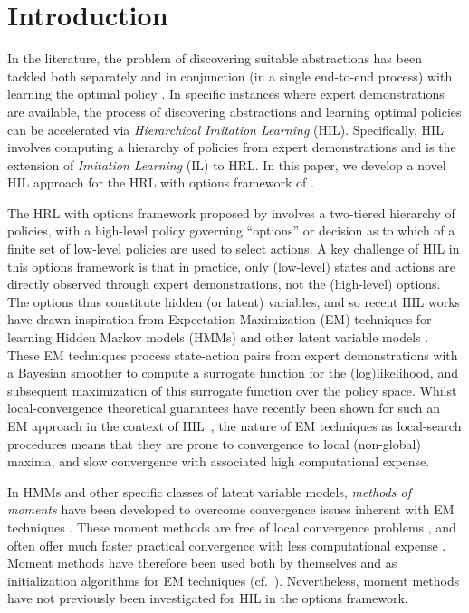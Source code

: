 \section{Introduction}
\label{sec:introduction}
In the literature, the problem of discovering suitable abstractions has been tackled both separately and in conjunction (in a single end-to-end process) with learning the optimal policy \citep{Barto2003}.
In specific instances where expert demonstrations are available, the process of discovering abstractions and learning optimal policies can be accelerated via \emph{Hierarchical Imitation Learning} (HIL).
Specifically, HIL involves computing a hierarchy of policies from expert demonstrations and is the extension of \emph{Imitation Learning} (IL) to HRL.
In this paper, we develop a novel HIL approach for the HRL with options framework of \citet{SUTTON1999181}.

The HRL with options framework proposed by \citet{SUTTON1999181} involves a two-tiered hierarchy of policies, with a high-level policy governing ``options'' or decision as to which of a finite set of low-level policies are used to select actions.
A key challenge of HIL in this options framework is that in practice, only (low-level) states and actions are directly observed through expert demonstrations, not the (high-level) options.
The options thus constitute hidden (or latent) variables, and so recent HIL works have drawn inspiration from Expectation-Maximization (EM) techniques for learning Hidden Markov models (HMMs) and other latent variable models \citep{Daniel2016,zhiyu20,Giammarino_2021}.
These EM techniques process state-action pairs from expert demonstrations with a Bayesian smoother to compute a surrogate function for the (log)likelihood, and subsequent maximization of this surrogate function over the policy space.
Whilst local-convergence theoretical guarantees have recently been shown for such an EM approach in the context of HIL~\citep{zhiyu20}, the nature of EM techniques as local-search procedures means that they are prone to convergence to local (non-global) maxima, and slow convergence with associated high computational expense.

In HMMs and other specific classes of latent variable models, \emph{methods of moments} have been developed to overcome convergence issues inherent with EM techniques \citep{hsu08,HsuKakade13,Mattila2020,Mattila2015,Mattila2017,Anandkumar2014,Parikh2012}.
These moment methods are free of local convergence problems \citep{Mattila2020,Anandkumar2014}, and often offer much faster practical convergence with less computational expense \citep{Mattila2015,Mattila2017}.
Moment methods have therefore been used both by themselves and as initialization algorithms for EM techniques (cf.~\citep{Zhang2016}).
Nevertheless, moment methods have not previously been investigated for HIL in the options framework.

